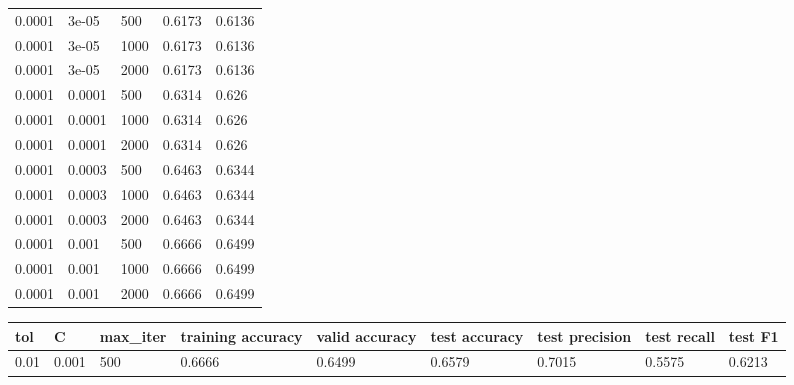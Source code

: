 \documentclass{article}%
\begin{document}
\begin{longtable}{l l l l l}
0.0001&3e{-}05&500&0.6173&0.6136\\%
0.0001&3e{-}05&1000&0.6173&0.6136\\%
0.0001&3e{-}05&2000&0.6173&0.6136\\%
0.0001&0.0001&500&0.6314&0.626\\%
0.0001&0.0001&1000&0.6314&0.626\\%
0.0001&0.0001&2000&0.6314&0.626\\%
0.0001&0.0003&500&0.6463&0.6344\\%
0.0001&0.0003&1000&0.6463&0.6344\\%
0.0001&0.0003&2000&0.6463&0.6344\\%
0.0001&0.001&500&0.6666&0.6499\\%
0.0001&0.001&1000&0.6666&0.6499\\%
0.0001&0.001&2000&0.6666&0.6499\\%
\hline%
\end{longtable}%
\begin{longtable}{l l l l l l l l l}%
\hline%
tol&C&max\_iter&training accuracy&valid accuracy&test accuracy&test precision&test recall&test F1\\%
\hline%
\endhead%
\hline%
0.01&0.001&500&0.6666&0.6499&0.6579&0.7015&0.5575&0.6213\\%
\hline%
\end{longtable}%
\end{document}
